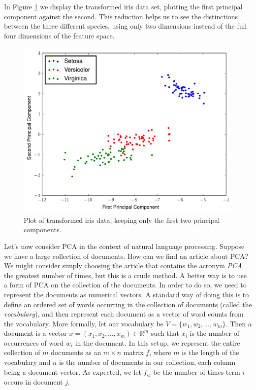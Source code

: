 In Figure \ref{fig:iris_pca} we display the transformed iris data set, plotting the first principal component against the second. This reduction helps us to see the distinctions between the three different species, using only two dimensions instead of the full four dimensions of the feature space.
\begin{figure}
\includegraphics[width=\textwidth]{iris_pca.pdf}
\caption{Plot of transformed iris data, keeping only the first two principal components.}
\label{fig:iris_pca}
\end{figure}


Let's now consider PCA in the context of natural language processing. 
Suppose we have a large collection of documents. How can we find an article about PCA? 
We might consider simply choosing the article that contains the acronym \emph{PCA} the greatest number of times, but this is a crude method. 
A better way is to use a form of PCA on the collection of the documents.
In order to do so, we need to represent the documents as numerical vectors. 
A standard way of doing this is to define an ordered set of words occurring in the collection of documents (called the \emph{vocabulary}), and then
represent each document as a vector of word counts from the vocabulary. 
More formally, let our vocabulary be $V = \{w_1,w_2,\ldots,w_m\}$.
Then a document is a vector $x  = (x_1,x_2,\ldots,x_m) \in \mathbb{R}^m$ such that $x_i$ is the number of occurrences of word $w_i$ in the document.
In this setup, we represent the entire collection of $m$ documents as an $m \times n$ matrix $f$, where $m$ is the length of the vocabulary and $n$ is the number of documents in our collection, each column being a document vector. As expected, we let $f_{ij}$ be the number of times term $i$ occurs in document $j$.

